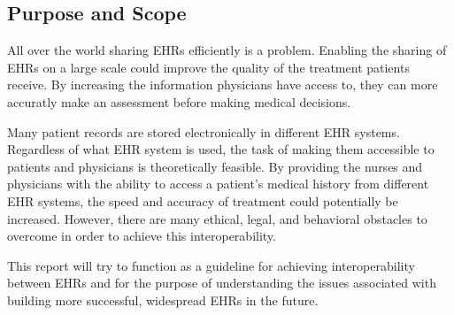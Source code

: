 \documentclass[14pt]{article}
\begin{document}


\subsection{Purpose and Scope}
All over the world sharing \glspl{EHR} efficiently is a problem. Enabling the sharing of \glspl{EHR} on a large scale could improve the quality of the treatment patients receive. By increasing the information physicians have access to, they can more accuratly make an assessment before making medical decisions.  

Many patient records are stored electronically in different \gls{EHR} systems. Regardless of what \gls{EHR} system is used, the task of making them accessible to patients and physicians is theoretically feasible. By providing the nurses and physicians with the ability to access a patient's medical history from different \gls{EHR} systems, the speed and accuracy of treatment could potentially be increased. However, there are many ethical, legal, and behavioral obstacles to overcome in order to achieve this interoperability.


This report will try to function as a guideline for achieving interoperability between \glspl{EHR} and for the purpose of understanding the issues associated with building more successful, widespread \glspl{EHR} in the future. 
\end{document}
